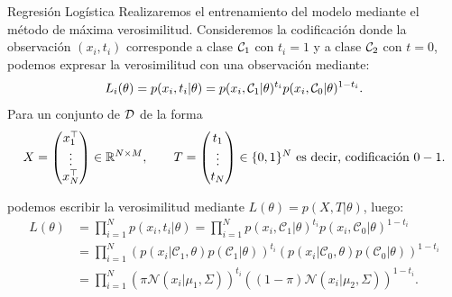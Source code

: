 \documentclass[9pt, handout]{beamer}
\begin{document}
\begin{frame}{Regresión Logística}
Realizaremos el entrenamiento del modelo mediante el método de máxima verosimilitud. \pause
Consideremos la codificación donde la observación $(x_i,t_i)$ corresponde a clase ${\mathcal C}_1$ con $t_i = 1$ y a clase ${\mathcal C}_2$ con  $t=0$, podemos expresar la verosimilitud con una observación mediante:
\begin{equation*}
  L_i(\theta) = p(x_i, t_i|\theta) =  p(x_i,{\mathcal C}_1|\theta)^{t_i}p(x_i,{\mathcal C}_0|\theta)^{1-t_i}. 
\end{equation*} \pause
Para un conjunto de ${\mathcal D}$ de la forma  
\begin{equation*}
X=\left(\begin{matrix}
    x_1^\top\\ \vdots\\ x_N^\top
  \end{matrix}\right)\in\mathbb{R}^{N\times M},\qquad
  T=\left(\begin{matrix}
    t_1\\ \vdots\\ t_N
  \end{matrix}\right)\in\{0,1\}^N \text{ es decir, codificación $0-1$.}
\end{equation*} \pause

podemos escribir la verosimilitud mediante $L(\theta) = p(X,T|\theta) $, luego:
\begin{align*}
  L(\theta) &= \prod_{i=1}^{N}p(x_i,t_i|\theta)
  = \prod_{i=1}^{N}p(x_i,\mathcal{C}_1|\theta)^{t_i}p(x_i,\mathcal{C}_0|\theta)^{1-t_i}\\
  &=\prod_{i=1}^{N}\left(p(x_i|\mathcal{C}_1,\theta)p(\mathcal{C}_1|\theta)\right)^{t_i}\left(p(x_i|\mathcal{C}_0,\theta)p(\mathcal{C}_0|\theta)\right)^{1-t_i}\\
  &= \prod_{i=1}^{N}(\pi\mathcal{N}(x_i|\mu_1,\Sigma))^{t_i}
  ((1-\pi)\mathcal{N}(x_i|\mu_2,\Sigma))^{1-t_i}.
\end{align*}


\end{frame}
\end{document}
